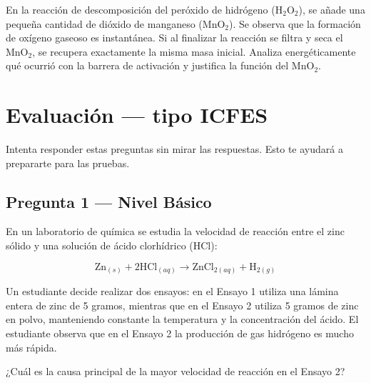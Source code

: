 \documentclass[
  spanish,
  letterpaper,
  12pt,
  oneside,
  open=any,
  DIV=15]{scrbook}
\newcommand{\setcolorsection}[2]{%
  \definecolor{currentsectionbg}{HTML}{#1}%
  \definecolor{currentsectionborder}{HTML}{#2}%
}
\begin{document}
\begin{tcolorbox}
En la reacción de descomposición del peróxido de hidrógeno
(\(\text{H}_2\text{O}_2\)), se añade una pequeña cantidad de dióxido de
manganeso (\(\text{MnO}_2\)). Se observa que la formación de oxígeno
gaseoso es instantánea. Si al finalizar la reacción se filtra y seca el
\(\text{MnO}_2\), se recupera exactamente la misma masa inicial. Analiza
energéticamente qué ocurrió con la barrera de activación y justifica la
función del \(\text{MnO}_2\).

\setcolorsection{f0c4b8}{dcb0a4}

\section{Evaluación --- tipo ICFES}\label{evaluaciuxf3n-tipo-icfes-7}

Intenta responder estas preguntas sin mirar las respuestas. Esto te
ayudará a prepararte para las pruebas.

\subsection{Pregunta 1 --- Nivel
Básico}\label{pregunta-1-nivel-buxe1sico-7}

En un laboratorio de química se estudia la velocidad de reacción entre
el zinc sólido y una solución de ácido clorhídrico (\(\text{HCl}\)):

\[
\text{Zn}_{(s)} + 2\text{HCl}_{(aq)} \rightarrow \text{ZnCl}_{2(aq)} + \text{H}_{2(g)}
\]

Un estudiante decide realizar dos ensayos: en el Ensayo 1 utiliza una
lámina entera de zinc de 5 gramos, mientras que en el Ensayo 2 utiliza 5
gramos de zinc en polvo, manteniendo constante la temperatura y la
concentración del ácido. El estudiante observa que en el Ensayo 2 la
producción de gas hidrógeno es mucho más rápida.

¿Cuál es la causa principal de la mayor velocidad de reacción en el
Ensayo 2?


\end{tcolorbox}
\end{document}
